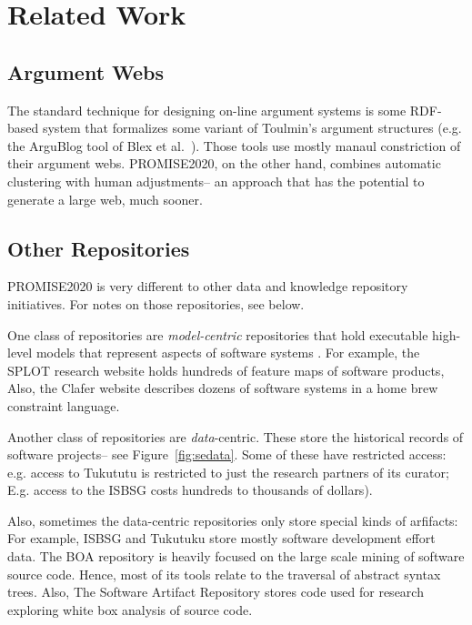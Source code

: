 \documentclass[journal]{IEEEtran}
\newcommand{\fig}[1]{Figure~\ref{fig:#1}}
\begin{document}
 \section{Related Work}\label{sect:rw}

\subsection{Argument Webs}

 

The standard technique for designing on-line argument systems is some 
   RDF-based system that formalizes some variant of Toulmin's argument structures
   (e.g. the ArguBlog tool of Blex et al.~\cite{Bex20149}). Those tools use mostly
   manaul constriction of their argument webs. PROMISE2020, on the other hand, combines
   automatic clustering with human adjustments-- an approach that has the potential to generate a large web, much sooner.
 
 
 

\subsection{Other Repositories}
PROMISE2020 is very different to  other data and knowledge repository initiatives.
For notes on those repositories, see below. 




One class of repositories are {\em model-centric} repositories that hold
executable high-level models that represent aspects of software systems .
For example, 
the SPLOT research website holds hundreds of feature maps of software products,
Also,
the Clafer website describes dozens of software systems in a home brew constraint language.

Another class of repositories are  {\em data}-centric. These store the historical records
of software projects-- see \fig{sedata}.
Some of these have restricted access:
e.g. access to Tukututu is restricted to just the research partners of its
curator; 
E.g. access to the ISBSG costs hundreds
to thousands of dollars). 

Also, sometimes the data-centric repositories only store special kinds of arfifacts:
For example, ISBSG and Tukutuku store mostly 
software development  effort data.  
The BOA repository is heavily focused on the large scale mining of software source code. Hence, most
of its tools relate to the traversal of abstract syntax trees.
Also,
The Software Artifact Repository stores code
used for research exploring white box analysis of source code. 
\end{document}
